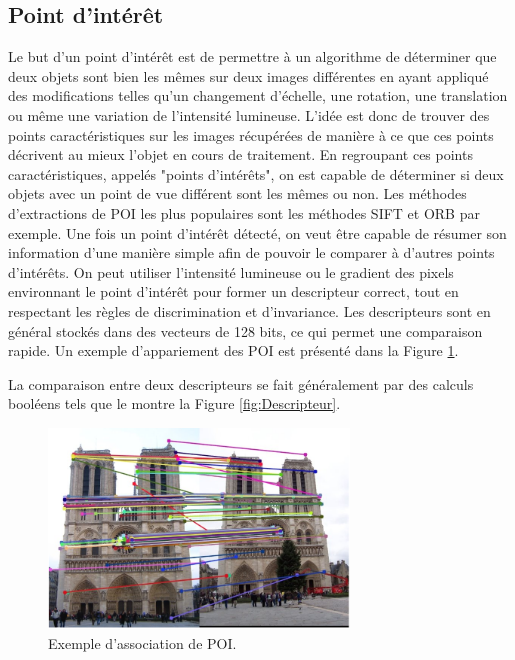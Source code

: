 \documentclass[11pt]{article}
\begin{document}
    \subsection*{Point d'intérêt}
      Le but d'un point d'intérêt est de permettre à un algorithme de déterminer que deux objets sont bien les mêmes sur deux images 
      différentes en ayant appliqué des modifications telles qu'un changement d'échelle, une rotation, une translation ou même une 
      variation de l'intensité lumineuse.
      L'idée est donc de trouver des points caractéristiques sur les images récupérées de manière à ce que ces points décrivent au mieux 
      l'objet en cours de traitement. En regroupant ces points caractéristiques, appelés "points d'intérêts", on est capable de déterminer 
      si deux objets avec un point de vue différent sont les mêmes ou non. Les méthodes d'extractions de POI les plus populaires 
      sont les méthodes SIFT et ORB par exemple.
      Une fois un point d'intérêt détecté, on veut être capable de résumer son information d'une manière simple afin de pouvoir le comparer
      à d'autres points d'intérêts. On peut utiliser l'intensité lumineuse ou le gradient des pixels environnant le point d'intérêt pour 
      former un descripteur correct, tout en respectant les règles de discrimination et d'invariance. Les descripteurs sont en général 
      stockés dans des vecteurs de 128 bits, ce qui permet une comparaison rapide.
      Un exemple d'appariement des POI est présenté dans la Figure \ref{fig:Appariement}. 

      La comparaison entre deux descripteurs se fait généralement par des calculs booléens tels que le montre la 
      Figure \ref{fig:Descripteur}.

      \begin{figure}[hbt]  
        \centering
        \includegraphics[width=80mm]{AssociationPOI.png}    
        \caption{Exemple d'association de POI.}
        \label{fig:Appariement}
      \end{figure} 
      
\end{document}

